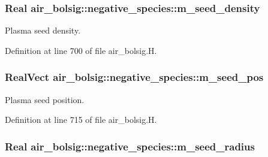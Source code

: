 \subsubsection[{\texorpdfstring{m\+\_\+seed\+\_\+density}{m_seed_density}}]{\setlength{\rightskip}{0pt plus 5cm}Real air\+\_\+bolsig\+::negative\+\_\+species\+::m\+\_\+seed\+\_\+density}\hypertarget{classair__bolsig_1_1negative__species_a8166e39c6bbedb5db5898b09b5aa454a}{}\label{classair__bolsig_1_1negative__species_a8166e39c6bbedb5db5898b09b5aa454a}


Plasma seed density. 



Definition at line 700 of file air\+\_\+bolsig.\+H.

\subsubsection[{\texorpdfstring{m\+\_\+seed\+\_\+pos}{m_seed_pos}}]{\setlength{\rightskip}{0pt plus 5cm}Real\+Vect air\+\_\+bolsig\+::negative\+\_\+species\+::m\+\_\+seed\+\_\+pos}\hypertarget{classair__bolsig_1_1negative__species_a57ce5977481f0a5d97bec53fcc34cdfa}{}\label{classair__bolsig_1_1negative__species_a57ce5977481f0a5d97bec53fcc34cdfa}


Plasma seed position. 



Definition at line 715 of file air\+\_\+bolsig.\+H.

\subsubsection[{\texorpdfstring{m\+\_\+seed\+\_\+radius}{m_seed_radius}}]{\setlength{\rightskip}{0pt plus 5cm}Real air\+\_\+bolsig\+::negative\+\_\+species\+::m\+\_\+seed\+\_\+radius}\hypertarget{classair__bolsig_1_1negative__species_a4eaf4b68c487fab16bb70560aee7fad4}{}\label{classair__bolsig_1_1negative__species_a4eaf4b68c487fab16bb70560aee7fad4}


